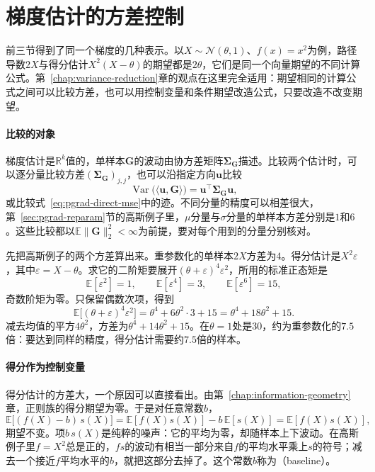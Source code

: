 \section{梯度估计的方差控制}
\label{sec:pgrad-variance}

前三节得到了同一个梯度的几种表示。以$X\sim\mathcal{N}(\theta,1)$、$f(x)=x^{2}$为例，路径导数$2X$与得分估计$X^{2}(X-\theta)$的期望都是$2\theta$，它们是同一个向量期望的不同计算公式。第~\ref{chap:variance-reduction}章的观点在这里完全适用：期望相同的计算公式之间可以比较方差，也可以用控制变量和条件期望改造公式，只要改造不改变期望。

\paragraph{比较的对象}

梯度估计是$\mathbb{R}^{k}$值的，单样本$\bm{G}$的波动由协方差矩阵$\bm{\Sigma}_{\bm{G}}$描述。比较两个估计时，可以逐分量比较方差$(\bm{\Sigma}_{\bm{G}})_{j,j}$，也可以沿指定方向$\bm{u}$比较
\[
  \operatorname{Var}\bigl(\langle\bm{u},\bm{G}\rangle\bigr)=\bm{u}^{\top}\bm{\Sigma}_{\bm{G}}\bm{u},
\]
或比较式~\eqref{eq:pgrad-direct-mse}中的迹。不同分量的精度可以相差很大，第~\ref{sec:pgrad-reparam}节的高斯例子里，$\mu$分量与$\sigma$分量的单样本方差分别是$1$和$6$。这些比较都以$\mathbb{E}\lVert\bm{G}\rVert_{2}^{2}<\infty$为前提，要对每个用到的分量分别核对。

先把高斯例子的两个方差算出来。重参数化的单样本$2X$方差为$4$。得分估计是$X^{2}\varepsilon$，其中$\varepsilon=X-\theta$。求它的二阶矩要展开$(\theta+\varepsilon)^{4}\varepsilon^{2}$，所用的标准正态矩是
\[
  \mathbb{E}[\varepsilon^{2}]=1,\qquad\mathbb{E}[\varepsilon^{4}]=3,\qquad\mathbb{E}[\varepsilon^{6}]=15,
\]
奇数阶矩为零。只保留偶数次项，得到
\[
  \mathbb{E}\bigl[(\theta+\varepsilon)^{4}\varepsilon^{2}\bigr]=\theta^{4}+6\theta^{2}\cdot3+15=\theta^{4}+18\theta^{2}+15 .
\]
减去均值的平方$4\theta^{2}$，方差为$\theta^{4}+14\theta^{2}+15$。在$\theta=1$处是$30$，约为重参数化的$7.5$倍：要达到同样的精度，得分估计需要约$7.5$倍的样本。

\paragraph{得分作为控制变量}

得分估计的方差大，一个原因可以直接看出。由第~\ref{chap:information-geometry}章，正则族的得分期望为零。于是对任意常数$b$，
\[
  \mathbb{E}\bigl[(f(X)-b)\,s(X)\bigr]=\mathbb{E}[f(X)s(X)]-b\,\mathbb{E}[s(X)]=\mathbb{E}[f(X)s(X)],
\]
期望不变。项$b\,s(X)$是纯粹的噪声：它的平均为零，却随样本上下波动。在高斯例子里$f=X^{2}$总是正的，$f s$的波动有相当一部分来自$f$的平均水平乘上$s$的符号；减去一个接近$f$平均水平的$b$，就把这部分去掉了。这个常数$b$称为（baseline）。

